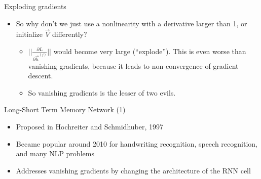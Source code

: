 
\begin{vbframe}{Exploding gradients}

\vfill

\begin{itemize}
	\item So why don't we just use a nonlinearity with a derivative larger than 1, or initialize $\vec V$ differently?
		\begin{itemize}
			\item $||\frac{\partial L}{\partial \vec h^{(j)}}||$ would become very large (``explode''). This is even worse than vanishing gradients, because it leads to non-convergence of gradient descent.
			\item So vanishing gradients is the lesser of two evils.
		\end{itemize}
\end{itemize}

\vfill

\end{vbframe}


\begin{vbframe}{Long-Short Term Memory Network (1)}

\vfill

\begin{itemize}
	\item Proposed in Hochreiter and Schmidhuber, 1997
	\item Became popular around 2010 for handwriting recognition, speech recognition, and many NLP problems
	\item Addresses vanishing gradients by changing the architecture of the RNN cell
\end{itemize}

\vfill

\end{vbframe}


